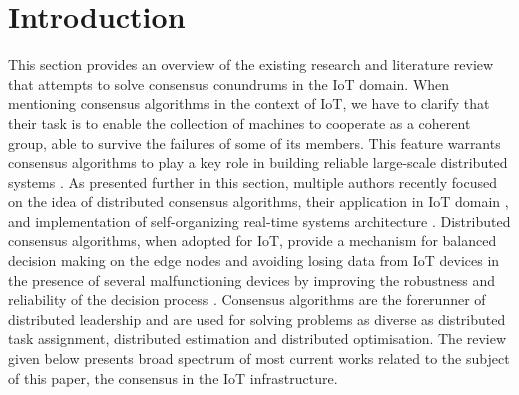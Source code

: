 \documentclass[oneside,12pt]{book}
\begin{document}
\section{Introduction}
This section provides an overview of the existing research and literature review that attempts to solve consensus conundrums in the IoT domain.\smallskip \newline
When mentioning consensus algorithms in the context of IoT, we have to clarify that their task is to enable the collection of machines to cooperate as a coherent group, able to survive the failures of some of its members. This feature warrants consensus algorithms to play a key role in building reliable large-scale distributed systems \citep{10.5555/2643634.2643666}.\smallskip \newline
As presented further in this section, multiple authors recently focused on the idea of distributed consensus algorithms, their application in IoT domain \citep{BOF2017601,RAGHAV2020101291,whittaker2020matchmaker,ZHANG2020574,FORTINO202034}, and implementation of self-organizing real-time systems architecture \citep{10.1007/978-3-030-30278-8_34,GUERRERO2019131,7372286}.\smallskip \newline 
Distributed consensus algorithms, when adopted for IoT, provide a mechanism for balanced decision making on the edge nodes and avoiding losing data from IoT devices in the presence of several malfunctioning devices by improving the robustness and reliability of the decision process \citep{6740862}.\smallskip \newline 
Consensus algorithms are the forerunner of distributed leadership and are used for solving problems as diverse as distributed task assignment, distributed estimation and distributed optimisation. The review given below presents broad spectrum of most current works related to the subject of this paper, the consensus in the IoT infrastructure. 
\end{document}
